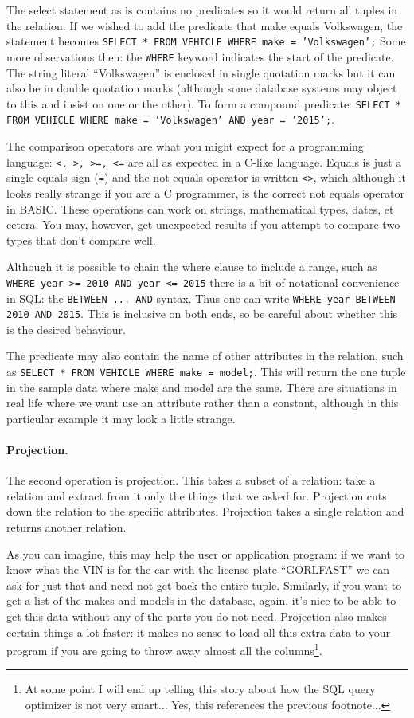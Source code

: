 The select statement as is contains no predicates so it would return all tuples in the relation. If we wished to add the predicate that make equals Volkswagen, the statement becomes \texttt{SELECT * FROM VEHICLE WHERE make = 'Volkswagen';} Some more observations then: the \texttt{WHERE} keyword indicates the start of the predicate. The string literal ``Volkswagen'' is enclosed in single quotation marks but it can also be in double quotation marks (although some database systems may object to this and insist on one or the other). To form a compound predicate: \texttt{SELECT * FROM VEHICLE WHERE make = 'Volkswagen' AND year = '2015';}. 

The comparison operators are what you might expect for a programming language: \texttt{<, >, >=, <=} are all as expected in a C-like language. Equals is just a single equals sign (\texttt{=}) and the not equals operator is written \texttt{<>}, which although it looks really strange if you are a C programmer, is the correct not equals operator in BASIC. These operations can work on strings, mathematical types, dates, et cetera. You may, however, get unexpected results if you attempt to compare two types that don't compare well.

Although it is possible to chain the where clause to include a range, such as \texttt{WHERE year >= 2010 AND year <= 2015} there is a bit of notational convenience in SQL: the \texttt{BETWEEN ... AND} syntax. Thus one can write \texttt{WHERE year BETWEEN 2010 AND 2015}. This is inclusive on both ends, so be careful about whether this is the desired behaviour. 

The predicate may also contain the name of other attributes in the relation, such as \texttt{SELECT * FROM VEHICLE WHERE make = model;}. This will return the one tuple in the sample data where make and model are the same. There are situations in real life where we want use an attribute rather than a constant, although in this particular example it may look a little strange.

\paragraph{Projection.} The second operation is projection. This takes a subset of a relation: take a relation and extract from it only the things that we asked for. Projection cuts down the relation to the specific attributes. Projection takes a single relation and returns another relation.

As you can imagine, this may help the user or application program: if we want to know what the VIN is for the car with the license plate ``GORLFAST'' we can ask for just that and need not get back the entire tuple. Similarly, if you want to get a list of the makes and models in the database, again, it's nice to be able to get this data without any of the parts you do not need. Projection also makes certain things a lot faster: it makes no sense to load all this extra data to your program if you are going to throw away almost all the columns\footnote{At some point I will end up telling this story about how the SQL query optimizer is not very smart... Yes, this references the previous footnote...}.

